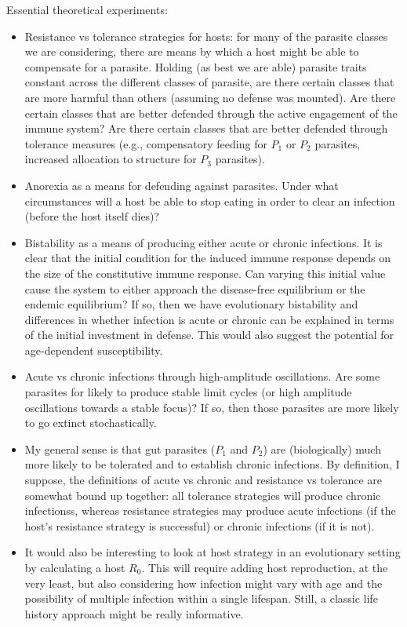 \documentclass[12pt,reqno,final,pdftex]{amsart}\usepackage[]{graphicx}\usepackage[]{color}
\theoremstyle{plain}
\numberwithin{equation}{part}
\begin{document}
Essential theoretical experiments:
\begin{itemize}
\item Resistance vs tolerance strategies for hosts: for many of the parasite classes we are considering, there are means by which a host might be able to compensate for a parasite. Holding (as best we are able) parasite traits constant across the different classes of parasite, are there certain classes that are more harmful than others (assuming no defense was mounted). Are there certain classes that are better defended through the active engagement of the immune system? Are there certain classes that are better defended through tolerance measures (e.g., compensatory feeding for $P_1$ or $P_2$ parasites, increased allocation to structure for $P_3$ parasites).
\item Anorexia as a means for defending against parasites. Under what circumstances will a host be able to stop eating in order to clear an infection (before the host itself dies)?
\item Bistability as a means of producing either acute or chronic infections. It is clear that the initial condition for the induced immune response depends on the size of the constitutive immune response. Can varying this initial value cause the system to either approach the disease-free equilibrium or the endemic equilibrium? If so, then we have evolutionary bistability and differences in whether infection is acute or chronic can be explained in terms of the initial investment in defense. This would also suggest the potential for age-dependent susceptibility.
\item Acute vs chronic infections through high-amplitude oscillations. Are some parasites for likely to produce stable limit cycles (or high amplitude oscillations towards a stable focus)? If so, then those parasites are more likely to go extinct stochastically.
\item My general sense is that gut parasites ($P_1$ and $P_2$) are (biologically) much more likely to be tolerated and to establish chronic infections. By definition, I suppose, the definitions of acute vs chronic and resistance vs tolerance are somewhat bound up together: all tolerance strategies will produce chronic infectionss, whereas resistance strategies may produce acute infections (if the host's resistance strategy is successful) or chronic infections (if it is not).
\item It would also be interesting to look at host strategy in an evolutionary setting by calculating a host $R_0$. This will require adding host reproduction, at the very least, but also considering how infection might vary with age and the possibility of multiple infection within a single lifespan. Still, a classic life history approach might be really informative.
\end{itemize}
\end{document}
